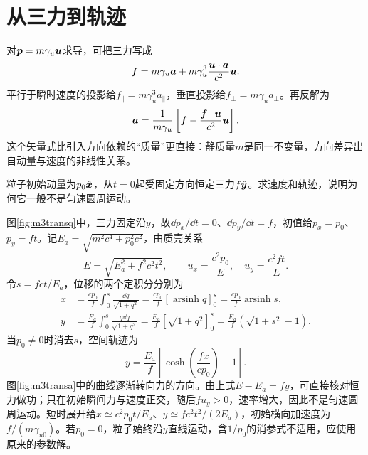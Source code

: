 \section{从三力到轨迹}
对$\bm{p}=m\gamma_u\bm{u}$求导，可把三力写成
\[
 \bm{f}=m\gamma_u\bm{a}+m\gamma_u^3
 \frac{\bm{u}\cdot\bm{a}}{c^2}\bm{u}.
\]
平行于瞬时速度的投影给$f_\parallel=m\gamma_u^3a_\parallel$，垂直投影给$f_\perp=m\gamma_ua_\perp$。再反解为
\[
 \bm{a}=\frac1{m\gamma_u}
 \left[\bm{f}-\frac{\bm{f}\cdot\bm{u}}{c^2}\bm{u}\right].
\]
这个矢量式比引入方向依赖的“质量”更直接：静质量$m$是同一不变量，方向差异出自动量与速度的非线性关系。

\begin{example}\label{ex:m3transconstant}
粒子初始动量为$p_0\hat{\bm{x}}$，从$t=0$起受固定方向恒定三力$f\hat{\bm{y}}$。求速度和轨迹，说明为何它一般不是匀速圆周运动。
\end{example}
\begin{solution}
图\ref{fig:m3transq}中，三力固定沿$y$，故$\dd p_x/\dd t=0$、$\dd p_y/\dd t=f$，初值给$p_x=p_0$、$p_y=ft$。记$E_a=\sqrt{m^2c^4+p_0^2c^2}$，由质壳关系
\[
 E=\sqrt{E_a^2+f^2c^2t^2},\qquad
 u_x=\frac{c^2p_0}{E},\quad u_y=\frac{c^2ft}{E}.
\]
令$s=fct/E_a$，位移的两个定积分分别为
\begin{align*}
 x&=\frac{cp_0}f\int_0^s\frac{\dd q}{\sqrt{1+q^2}}
 =\frac{cp_0}f[\operatorname{arsinh}q]_0^s
 =\frac{cp_0}f\operatorname{arsinh}s,\\
 y&=\frac{E_a}f\int_0^s\frac{q\dd q}{\sqrt{1+q^2}}
 =\frac{E_a}f[\sqrt{1+q^2}]_0^s
 =\frac{E_a}f(\sqrt{1+s^2}-1).
\end{align*}
当$p_0\ne0$时消去$s$，空间轨迹为
\[
 y=\frac{E_a}f\left[\cosh\left(\frac{fx}{cp_0}\right)-1\right].
\]
图\ref{fig:m3transa}中的曲线逐渐转向力的方向。由上式$E-E_a=fy$，可直接核对恒力做功；只在初始瞬间力与速度正交，随后$fu_y>0$，速率增大，因此不是匀速圆周运动。短时展开给$x\simeq c^2p_0t/E_a$、$y\simeq fc^2t^2/(2E_a)$，初始横向加速度为$f/(m\gamma_{u0})$。若$p_0=0$，粒子始终沿$y$直线运动，含$1/p_0$的消参式不适用，应使用原来的参数解。
\end{solution}

